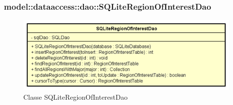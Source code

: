 \documentclass[../DefinizioneDiProdotto.tex]{subfiles}
\begin{document}
\subsubsection{model::dataaccess::dao::SQLiteRegionOfInterestDao}

    \begin{figure}[H]
        \centering
        \includegraphics{img/SQLiteRegionOfInterestDao.png}
        \caption{Classe SQLiteRegionOfInterestDao}\label{fig:model::dataaccess::dao::SQLiteRegionOfInterestDao} 
    \end{figure}
\end{document}

